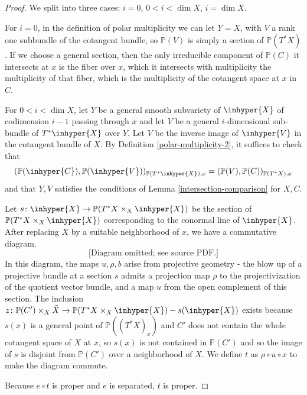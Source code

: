 \begin{proof} We split into three cases: $i=0$, $0< i < \dim X$, $i=\dim X$.

For $i=0$, in the definition of polar multiplicity we can let $Y =X$, with $V$ a rank one subbundle of the cotangent bundle, so $\mathbb P(V)$ is simply a section of $\mathbb P(T^* X)$. If we choose a general section, then the only irreducible component of $\mathbb P(C)$ it intersects at $x$ is the fiber over $x$, which it intersects with multiplicity the multiplicity of that fiber, which is the multiplicity of the cotangent space at $x$ in $C$.

For $0< i < \dim X$, let $Y$ be a general smooth subvariety of $\inhyper{X}$ of codimension $i-1$ passing through $x$ and let $V$ be a general $i$-dimensional sub-bundle of $T^* \inhyper{X}$ over $Y$. Let $V$ be the inverse image of $\inhyper{V}$ in the cotangent bundle of $X$. By Definition \ref{polar-multiplicity-2}, it suffices to check that \[( \mathbb P( \inhyper{C}), \mathbb P(\inhyper{V}))_{\mathbb P( T^* \inhyper{X}),x}  =(  \mathbb P(V) , \mathbb P(C) )_{\mathbb P(T^* X),x}\] and that $Y,V$ satisfies the conditions of Lemma \ref{intersection-comparison} for $X,C$.

Let $s \colon \inhyper{X} \to  \mathbb P(T^* X \times_X \inhyper{X})$ be the section of $\mathbb P(T^* X \times_X \inhyper{X})$ corresponding to the conormal line of $\inhyper{X}$. After replacing $X$ by a suitable neighborhood of $x$, we have a commutative diagram.
\begin{equation}  \text{[Diagram omitted; see source PDF.]} \end{equation}
In this diagram, the maps $u, \rho, b$ arise from projective geometry - the blow up of a projective bundle at a section $s$ admits a projection map $\rho$ to the projectivization of the quotient vector bundle, and a map $u$ from the open complement of this section. The inclusion $z\colon   \mathbb P( C' ) \times_X \tilde{X}  \to \mathbb P(T^*X \times_X \inhyper{X}  ) - s(\inhyper{X}) $ exists because $s(x)$ is a general point of $\mathbb P( (T^*X)_x)$ and $C'$ does not contain the whole cotangent space of $X$ at $x$, so $s(x)$ is not contained in $\mathbb P(C')$ and so the image of $s$ is disjoint from $\mathbb P(C')$ over a neighborhood of $X$. We define $t$ as $\rho\circ u \circ x$ to make the diagram commute.

Because $e\circ t$ is proper and $e$ is separated, $t$ is proper.


\end{proof}
